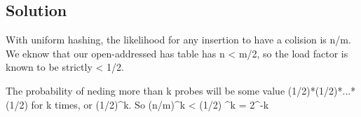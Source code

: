 \subsection*{Solution}

With uniform hashing, the likelihood for any insertion to have a colision is n/m. We eknow that our open-addressed has table has n < m/2, so the load factor is known to be strictly < 1/2. 

The probability of neding more than k probes will be some value (1/2)*(1/2)*...*(1/2) for k times, or (1/2)^k. So (n/m)^k < (1/2) ^k = 2^-k
